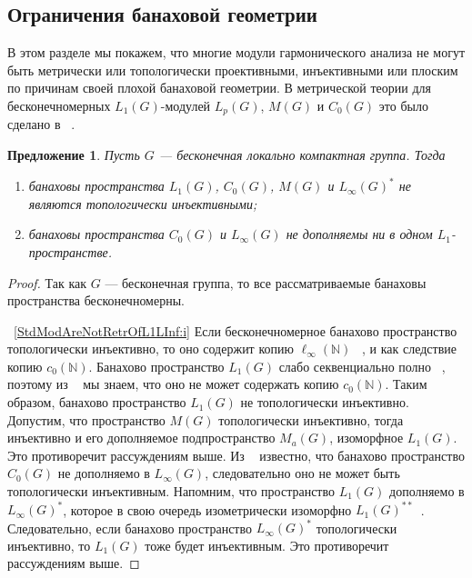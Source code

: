 \documentclass{article}
\numberwithin{equation}{section}
\theoremstyle{plain}
\newtheorem{propos}{Предложение}
\theoremstyle{definition}
\newtheorem{proof}{Доказательство}\def\theproof{}
\begin{document}
\begin{fulltext}

\section{Ограничения банаховой
	геометрии}\label{SubSectionBanachGeometricRestriction}

В этом разделе мы покажем, что многие модули гармонического анализа не могут
быть метрически или топологически проективными, инъективными или плоским по
причинам своей плохой банаховой геометрии. В метрической теории для
бесконечномерных $L_1(G)$-модулей $L_p(G)$, $M(G)$ и $C_0(G)$ это было сделано в
~\cite[теоремы~4.12--4.14]{GravInjProjBanMod}.
 
\begin{propos}\label{StdModAreNotRetrOfL1LInf} Пусть $G$ --- бесконечная
локально компактная группа. Тогда
\begin{enumerate}[label = (\roman*)]
    \item банаховы пространства $L_1(G)$, $C_0(G)$, $M(G)$ и ${L_\infty(G)}^*$
    не являются топологически инъективными;\label{StdModAreNotRetrOfL1LInf:i}
    
	\item банаховы пространства $C_0(G)$ и $L_\infty(G)$ не дополняемы ни в
    одном $L_1$-\\пространстве.\label{StdModAreNotRetrOfL1LInf:ii}
\end{enumerate}
\end{propos}
\begin{proof}
Так как $G$ --- бесконечная группа, то все рассматриваемые банаховы пространства
бесконечномерны.

~\ref{StdModAreNotRetrOfL1LInf:i} Если бесконечномерное банахово пространство
топологически инъективно, то оно содержит копию $\ell_\infty(\mathbb{N})$
~\cite[следствие~1.1.4]{RosOnRelDisjFamOfMeas}, и как следствие копию
$c_0(\mathbb{N})$. Банахово пространство $L_1(G)$ слабо секвенциально полно
~\cite[следствие~III.C.14]{WojBanSpForAnalysts}, поэтому из
~\cite[следствие~5.2.11]{KalAlbTopicsBanSpTh} мы знаем, что оно не может
содержать копию $c_0(\mathbb{N})$. Таким образом, банахово пространство $L_1(G)$
не топологически инъективно. Допустим, что пространство $M(G)$ топологически
инъективно, тогда инъективно и его дополняемое подпространство $M_a(G)$,
изоморфное $L_1(G)$. Это противоречит рассуждениям выше. Из
~\cite[следствие~3]{LauMingComplSubspInLInfOfG} известно, что банахово
пространство $C_0(G)$ не дополняемо в $L_\infty(G)$, следовательно оно не может
быть топологически инъективным. Напомним, что пространство $L_1(G)$ дополняемо в
${L_\infty(G)}^*$, которое в свою очередь изометрически изоморфно
${L_1(G)}^{**}$~\cite[предложение~B10]{DefFloTensNorOpId}. Следовательно, если
банахово пространство ${L_\infty(G)}^*$ топологически инъективно, то $L_1(G)$
тоже будет инъективным. Это противоречит рассуждениям выше.


\end{proof}
\end{fulltext}
\end{document}
